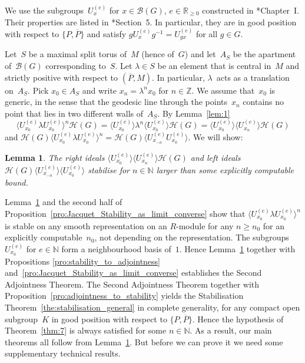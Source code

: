 \documentclass{amsart}
\newtheorem{lem}[theorem]{Lemma}
\theoremstyle{remark}
\theoremstyle{definition}
\newcommand*{\nb}{\nobreakdash}%
\newcommand*{\idem}[1]{\langle#1\rangle}%
\newcommand*{\opp}[1]{\overline{#1}}%
\newcommand*{\N}{\mathbb N}%
\newcommand*{\Z}{\mathbb Z}%
\newcommand*{\R}{\mathbb R}%
\newcommand*{\ST}{S}%
\newcommand*{\UC}[1]{U_{#1}}%
\newcommand{\ring}{R}%
\newcommand{\bt}{\mathcal B(G)}%
\newcommand*{\Hecke}{\mathcal H}%
\begin{document}
We use the subgroups~\(\UC{x}^{(e)}\) for \(x \in \bt\), \(e \in \R_{\geq 0}\) constructed in \cite{Schneider-Stuhler:Rep_sheaves}*{Chapter~I}.  Their properties are listed in \cite{Meyer-Solleveld:Characters_growth}*{Section~5}.  In particular, they are in good position with respect to \(\{P,\opp{P}\}\) and satisfy \(g \UC{x}^{(e)} g^{-1} = \UC{g x}^{(e)}\) for all \(g \in G\).

Let~\(\ST\) be a maximal split torus of~\(M\) (hence of~\(G\)) and let~\(A_\ST\) be the apartment of~\(\bt\) corresponding to~\(\ST\).  Let \(\lambda \in \ST\) be an element that is central in~\(M\) and strictly positive with respect to \((\opp{P},M)\).  In particular, \(\lambda\)~acts as a translation on~\(A_\ST\).  Pick \(x_0 \in A_\ST\) and write \(x_n = \lambda^n x_0\) for \(n \in \Z\).  We assume that~\(x_0\) is generic, in the sense that the geodesic line through the points~\(x_n\) contains no point that lies in two different walls of~\(A_\ST\).  By Lemma~\ref{lem:1}
\begin{equation}
  \label{eq:Ux0}
  \idem{\UC{x_0}^{(e)} \lambda \UC{x_0}^{(e)}}^n \Hecke(G)
  = \idem{\UC{x_0}^{(e)}} \lambda^n \idem{\UC{x_0}^{(e)}} \Hecke(G)
  = \idem{\UC{x_0}^{(e)}} \idem{\UC{x_n}^{(e)}} \Hecke(G)
\end{equation}
and \(\Hecke(G)\idem{\UC{x_0}^{(e)} \lambda \UC{x_0}^{(e)}}^n = \Hecke(G)\idem{\UC{x_{-n}}^{(e)} \UC{x_0}^{(e)}}\).  We will show:

\begin{lem}
  \label{lem:stabilisation_special}
  The right ideals \(\idem{\UC{x_0}^{(e)}}\idem{\UC{x_n}^{(e)}} \Hecke(G)\) and left ideals \(\Hecke(G)\idem{\UC{x_{-n}}^{(e)}}\idem{\UC{x_0}^{(e)}}\) stabilise for \(n\in\N\) larger than some
explicitly computable bound.
\end{lem}

Lemma~\ref{lem:stabilisation_special} and the second half of Proposition~\ref{pro:Jacquet_Stability_as_limit_converse} show that \(\idem{\UC{x_0}^{(e)} \lambda \UC{x_0}^{(e)}}^n\) is stable on any smooth representation on an \(\ring\)\nb-module for any \(n\ge n_0\) for an explicitly computable~\(n_0\), not depending on the representation.  The subgroups \(\UC{x_0}^{(e)}\) for \(e\in\N\) form a neighbourhood basis of~\(1\).  Hence Lemma~\ref{lem:stabilisation_special} together with Propositions \ref{pro:stability_to_adjointness} and~\ref{pro:Jacquet_Stability_as_limit_converse} establishes the Second Adjointness Theorem.  The Second Adjointness Theorem together with Proposition~\ref{pro:adjointness_to_stability} yields the Stabilisation Theorem~\ref{the:stabilisation_general} in complete generality, for any compact open subgroup~\(K\) in good position with respect to \(\{P,\opp{P}\}\).  Hence the hypothesis of Theorem~\ref{thm:7} is always satisfied for some \(n\in\N\).  As a result, our main theorems all follow from Lemma~\ref{lem:stabilisation_special}.  But before we can prove it we need some supplementary technical results.
\end{document}
